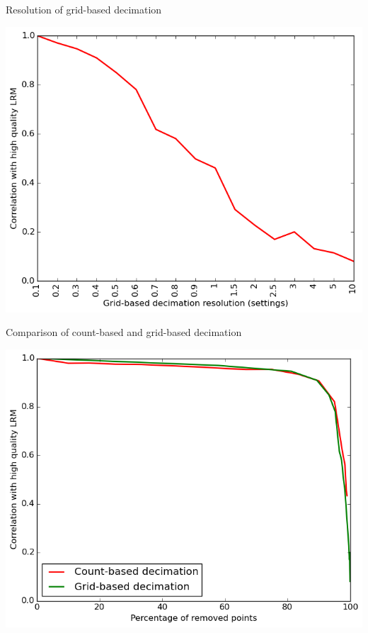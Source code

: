 \documentclass[xcolor={dvipsnames,usenames},beamer,aspectratio=1610]{beamer}
\begin{document}
\begin{frame}{Resolution of grid-based decimation}

\begin{center}
\includegraphics[height=0.8\textheight]{lrm_grid}
\end{center}

\end{frame}


\begin{frame}{Comparison of count-based and grid-based decimation}

\begin{center}
\includegraphics[height=0.8\textheight]{lrm_comparison_grid_count}
\end{center}

\end{frame}
\end{document}
